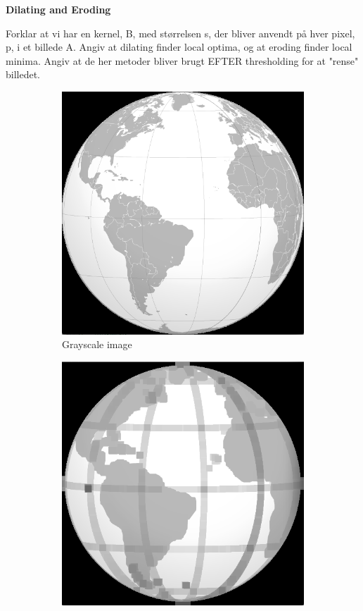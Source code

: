 \noindent \textbf{Dilating and Eroding} \par
Forklar at vi har en kernel, B, med størrelsen s, der bliver anvendt på hver pixel, p, i et billede A.
Angiv at dilating finder local optima, og at eroding finder local minima.
Angiv at de her metoder bliver brugt EFTER thresholding for at "rense" billedet. \\

\begin{figure}[!ht]
        \centering
        \begin{subfigure}[b]{0.3\textwidth}
                \includegraphics[scale = 0.2]{img/globe}
                \caption{Grayscale image}
        \end{subfigure}
		\quad
        \begin{subfigure}[b]{0.3\textwidth}
                \includegraphics[scale = 0.2]{img/erode}

\end{subfigure}
\end{figure}
